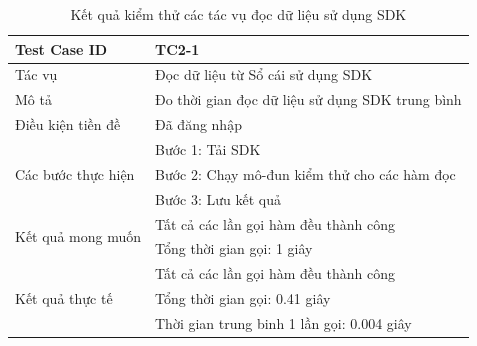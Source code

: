 \documentclass[../DoAn.tex]{subfiles}
\begin{document}
\begingroup
\renewcommand{\arraystretch}{1.5} %
\begin{table}[H]
    \centering
    \def\arraystretch{1.5}
    \caption{Kết quả kiểm thử các tác vụ đọc dữ liệu sử dụng SDK}
    \label{tab:TestSDKRead}
    \begin{tabular}{|p{}|p{}|}
        \hline
        Test Case ID                                       & TC2-1                                           \\ \hline
        Tác vụ                                             & Đọc dữ liệu từ Sổ cái sử dụng SDK               \\ \hline
        Mô tả                                              & Đo thời gian đọc dữ liệu sử dụng SDK trung bình \\ \hline
        Điều kiện tiền đề                                  & Đã đăng nhập                                    \\ \hline
        \multirow[t]{3}{0.3\textwidth}{Các bước thực hiện} & Bước 1: Tải SDK                                 \\
                                                           & Bước 2: Chạy mô-đun kiểm thử cho các hàm đọc    \\
                                                           & Bước 3: Lưu kết quả                             \\ \hline
        \multirow[t]{2}{0.3\textwidth}{Kết quả mong muốn}  & Tất cả các lần gọi hàm đều thành công           \\
                                                           & Tổng thời gian gọi: 1 giây                      \\ \hline
        \multirow[t]{3}{0.3\textwidth}{Kết quả thực tế}    & Tất cả các lần gọi hàm đều thành công           \\
                                                           & Tổng thời gian gọi: 0.41 giây                   \\
                                                           & Thời gian trung binh 1 lần gọi: 0.004 giây      \\ \hline
    \end{tabular}
\end{table}
\endgroup
\end{document}
